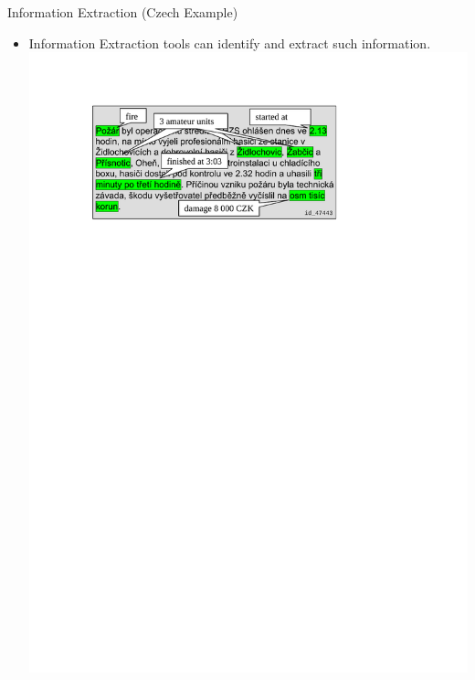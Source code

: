 \documentclass[xcolor=dvipsnames]{beamer}
\begin{document}
\begin{frame}{Information Extraction (Czech Example)}  
\begin{itemize}
	\item Information Extraction tools can identify and extract such information.
	\medskip
	\includegraphics[width=0.85\hsize]{img/fireman_annotated}
\end{itemize}
\end{frame}
\end{document}
